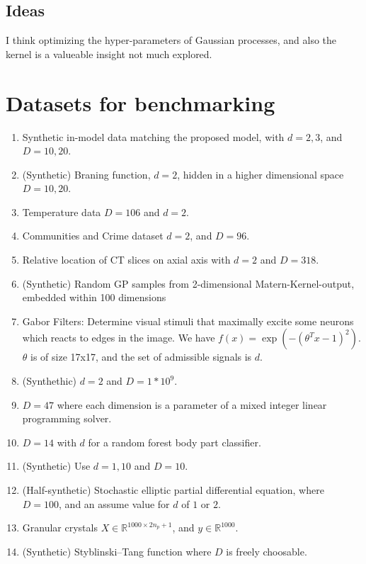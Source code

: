 \subsection{Ideas}
I think optimizing the hyper-parameters of Gaussian processes, and also the kernel is a valueable insight not much explored.


\section{Datasets for benchmarking}

\begin{enumerate}
\item \citep{Garnett2013} Synthetic in-model data matching the proposed model, with $d=2, 3$, and $D=10, 20$.
\item \citep{Garnett2013} (Synthetic) Braning function, $d=2$, hidden in a higher dimensional space $D=10, 20$.
\item \citep{Garnett2013} Temperature data $D=106$ and $d=2$.
\item \citep{Garnett2013} Communities and Crime dataset $d=2$, and $D=96$. 
\item \citep{Garnett2013} Relative location of CT slices on axial axis with $d = 2$ and $D=318$. 
\item \citep{Djolonga2013} (Synthetic) Random GP samples from 2-dimensional Matern-Kernel-output, embedded within 100 dimensions
\item \citep{Djolonga2013} Gabor Filters: Determine visual stimuli that maximally excite some neurons which reacts to edges in the image.
We have $f(x) = \exp( -( \theta^T x - 1 )^2 )$. $\theta$ is of size 17x17, and the set of admissible signals is $d$.
\item \citep{Wang2013} (Synthethic) $d=2$ and $D=1*10^9$.
\item \citep{Wang2013} $D=47$ where each dimension is a parameter of a mixed integer linear programming solver.
\item \citep{Wang2013} $D=14$ with $d$ for a random forest body part classifier.
\item \citep{Tripathy}  (Synthetic) Use $d=1,10$ and $D=10$.
\item \citep{Tripathy} (Half-synthetic) Stochastic elliptic partial differential equation, where $D=100$, and an assume value for $d$ of $1$ or $2$.
\item \citep{Tripathy} Granular crystals $X \in \mathbb{R}^{1000 \times 2n_p +1}$, and $y \in \mathbb{R}^{1000}$.
\item \citep{Gardner2017} (Synthetic) Styblinski–Tang function where $D$ is freely choosable.

\end{enumerate}
